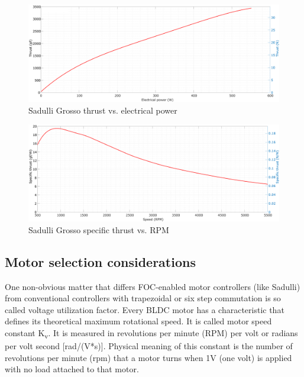 \begin{figure}[!hbt]
    \centerline{\includegraphics[width=1\textwidth]{figures/thrust_graphs/grosso_thrust-power.pdf}}
    \caption{Sadulli Grosso thrust  vs. electrical power}
\end{figure}

\begin{figure}[!hbt]
    \centerline{\includegraphics[width=1\textwidth]{figures/thrust_graphs/grosso_specific_thrust-rpm.pdf}}
    \caption{Sadulli Grosso specific thrust vs. RPM}
\end{figure}

\newpage

\subsection{Motor selection considerations}{\label{sec:motor_selection}}

One non-obvious matter that differs FOC-enabled motor controllers (like Sadulli) from conventional controllers with 
trapezoidal or six step commutation is so called voltage utilization factor.
Every BLDC motor has a characteristic that defines its theoretical maximum rotational speed. 
It is called  motor speed constant K\textsubscript{v}. 
It is measured in revolutions per minute (RPM) per volt or radians per volt second [rad/(V*s)].
Physical meaning of this constant is the number of revolutions per minute (rpm) that a motor turns when 1V (one volt) 
is applied with no load attached to that motor. 

